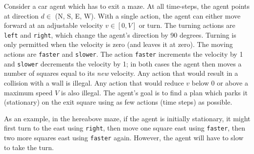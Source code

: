 \documentclass[11pt, a4paper]{article}
\begin{document}
Consider a car agent which has to exit a maze. At all time-steps, the agent points at direction $d \in$ (N, S, E, W). With a single action, the agent can either move forward at an adjustable velocity $v \in [0, V]$ or turn. The turning actions are \texttt{left} and \texttt{right}, which change the agent’s direction by 90 degrees. Turning is only permitted when the velocity is zero (and leaves it at zero). The moving actions are \texttt{faster} and \texttt{slower}. The action \texttt{faster} increments the velocity by 1 and \texttt{slower} decrements the velocity by 1; in both cases the agent then moves a number of squares equal to its \emph{new} velocity. Any action that would result in a collision with a wall is illegal. Any action that would reduce $v$ below 0 or above a maximum speed $V$ is also illegal. The agent’s goal is to find a plan which parks it (stationary) on the exit square using as few actions (time steps) as possible.

As an example, in the hereabove maze, if the agent is initially stationary, it might first turn to the east using \texttt{right}, then move one square east using \texttt{faster}, then two more squares east using \texttt{faster} again. However, the agent will have to slow to take the turn.
\end{document}
